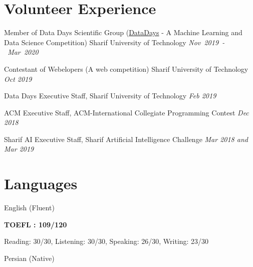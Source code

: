 \documentclass[11pt,line,margin]{resume}
\begin{document}
\begin{resume}
\vspace{-0.05in}
\section{\sc Volunteer Experience } 
\begin{list2}
\item[] Member of Data Days Scientific Group (\href {https://datadays.sharif.edu}{DataDays} - A Machine Learning and Data Science Competition) Sharif University of Technology \hspace*{\fill}\mbox{\textit {Nov 2019 - Mar 2020}}
\item[] Contestant of Webelopers (A web competition) Sharif University of Technology \hfill\textit{Oct 2019} 
\item[] Data Days Executive Staff, Sharif University of Technology \hfill\textit{Feb 2019} 
\item[] ACM Executive Staff, ACM-International Collegiate Programming Contest \hfill\textit{Dec 2018}
\item[] Sharif AI Executive Staff, Sharif Artificial Intelligence Challenge \hfill\textit{Mar 2018 and Mar 2019}
\end{list2}
   
 \vspace{-0.05in}
\section{\sc Languages} 
\begin{list2}
\item[] English (Fluent) 
\begin{list2}
		\item {\bf TOEFL : 109/120}
			
		Reading: 30/30, Listening: 30/30, Speaking: 26/30, Writing: 23/30
\end{list2}
\item[] Persian (Native)
\end{list2}


\end{resume}   
\end{document}
